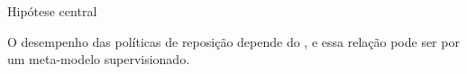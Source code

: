 \begin{frame}{Hipótese central}
  \begin{center}
    \large O desempenho das políticas de reposição depende do
    , e essa relação pode
    ser  por um meta-modelo supervisionado.
  \end{center}
\end{frame}
